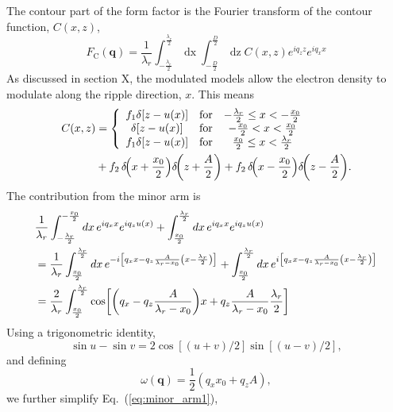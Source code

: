 \documentclass[12pt,letterpaper]{article}
\newcommand{\dx}{\mathop{dx}}
\newcommand{\dz}{\mathop{dz}}
\newcommand{\FC}{F_\mathrm{C}}
\begin{document}
The contour part of the form factor is the Fourier transform of the contour
function, $C(x,z)$,
\[
  \FC(\mathbf{q}) = \frac{1}{\lambda_r}
  \int_{-\frac{\lambda_r}{2}}^{\frac{\lambda_r}{2}}\dx
  \int_{-\frac{D}{2}}^\frac{D}{2}\dz 
  C(x,z) e^{iq_zz} e^{iq_xx}
\] 
As discussed in section X, the modulated models allow
the electron density to modulate along the ripple direction, $x$. This means
\begin{align}
  C(x,z) &= \left\{
  \begin{array}{ccc}
    f_1\delta[z-u(x)] & \text{for} & -\frac{\lambda_r}{2} \leq x < -\frac{x_0}{2} \\
    \delta[z-u(x)] & \text{for} & -\frac{x_0}{2} < x < \frac{x_0}{2} \\
    f_1\delta[z-u(x)] & \text{for} & \frac{x_0}{2} \leq x < \frac{\lambda_r}{2} \\    
  \end{array}
  \right. \nonumber\\
  &+ f_2\,\delta\!\mathopen{}\left( x+\frac{x_0}{2} \right)\mathclose{}\delta\!\mathopen{}\left( z+\frac{A}{2} \right)\mathclose{} 
   + f_2\,\delta\!\mathopen{}\left( x-\frac{x_0}{2} \right)\mathclose{}\delta\!\mathopen{}\left( z-\frac{A}{2} \right)\mathclose{}.
\end{align}
The contribution from the minor arm is
\begin{align}
  & \frac{1}{\lambda_r}
  \int_{-\frac{\lambda_r}{2}}^{-\frac{x_0}{2}}\dx e^{iq_xx} e^{iq_zu(x)}
  + \int_{\frac{x_0}{2}}^{\frac{\lambda_r}{2}}\dx e^{iq_xx} e^{iq_zu(x)} \nonumber\\
  &= \frac{1}{\lambda_r}
     \int_{\frac{x_0}{2}}^{\frac{\lambda_r}{2}}\dx 
     e^{-i\left[q_xx-q_z\frac{A}{\lambda_r-x_0}\left(x-\frac{\lambda_r}{2}\right)\right]}
     + \int_{\frac{x_0}{2}}^{\frac{\lambda_r}{2}}\dx 
     e^{i\left[q_xx-q_z\frac{A}{\lambda_r-x_0}\left(x-\frac{\lambda_r}{2}\right)\right]} \nonumber\\
  &= \frac{2}{\lambda_r}
     \int_{\frac{x_0}{2}}^{\frac{\lambda_r}{2}}   
     \cos\bracks{\pars{q_x-q_z\frac{A}{\lambda_r-x_0}}x
                 +q_z\frac{A}{\lambda_r-x_0}\frac{\lambda_r}{2}} \label{eq:minor_arm1}
\end{align}
Using a trigonometric identity, 
\[
  \sin u-\sin v = 2\cos[(u+v)/2]\sin[(u-v)/2],
\]
and defining 
\begin{equation}
  \omega(\mathbf{q}) = \frac{1}{2}\left(q_xx_0 + q_zA\right),
\end{equation}
we further simplify Eq.~(\ref{eq:minor_arm1}),
\end{document}
